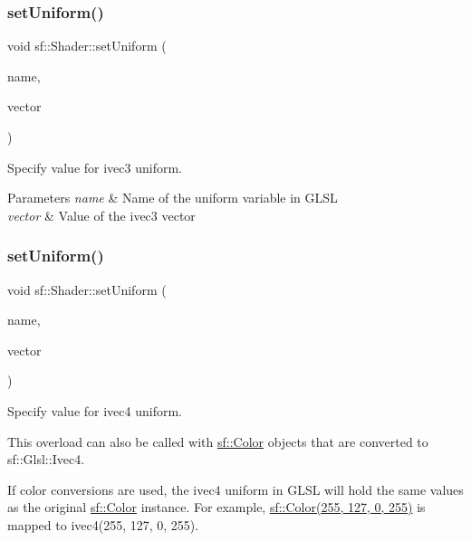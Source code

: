 \subsubsection{\texorpdfstring{set\+Uniform()}{setUniform()}\hspace{0.1cm}{\footnotesize\ttfamily [7/16]}}
{\footnotesize\ttfamily void sf\+::\+Shader\+::set\+Uniform (\begin{DoxyParamCaption}\item[{const std\+::string \&}]{name,  }\item[{const \hyperlink{namespacesf_1_1_glsl_a64f403dd0219e7f128ffddca641394df}{Glsl\+::\+Ivec3} \&}]{vector }\end{DoxyParamCaption})}



Specify value for {\ttfamily ivec3} uniform. 


\begin{DoxyParams}{Parameters}
{\em name} & Name of the uniform variable in G\+L\+SL \\
\hline
{\em vector} & Value of the ivec3 vector \\
\hline
\end{DoxyParams}
\mbox{\label{classsf_1_1_shader_a380e7a5a2896162c5fd08966c4523790}} 
\subsubsection{\texorpdfstring{set\+Uniform()}{setUniform()}\hspace{0.1cm}{\footnotesize\ttfamily [8/16]}}
{\footnotesize\ttfamily void sf\+::\+Shader\+::set\+Uniform (\begin{DoxyParamCaption}\item[{const std\+::string \&}]{name,  }\item[{const \hyperlink{structsf_1_1priv_1_1_vector4}{Glsl\+::\+Ivec4} \&}]{vector }\end{DoxyParamCaption})}



Specify value for {\ttfamily ivec4} uniform. 

This overload can also be called with \hyperlink{classsf_1_1_color}{sf\+::\+Color} objects that are converted to sf\+::\+Glsl\+::\+Ivec4.

If color conversions are used, the ivec4 uniform in G\+L\+SL will hold the same values as the original \hyperlink{classsf_1_1_color}{sf\+::\+Color} instance. For example, \hyperlink{classsf_1_1_color}{sf\+::\+Color(255, 127, 0, 255)} is mapped to ivec4(255, 127, 0, 255).


